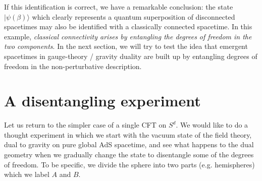 \documentclass[12pt,epsf]{article}
\renewcommand{\(}{\left(}
\renewcommand{\)}{\right)}
\begin{document}
If this identification is correct, we have a remarkable conclusion: the state $|\psi (\beta) \rangle$ which clearly represents a quantum superposition of disconnected spacetimes may also be identified with a classically connected spacetime. In this example, {\it classical connectivity arises by entangling the degrees of freedom in the two components}. In the next section, we will try to test the idea that emergent spacetimes in gauge-theory / gravity duality are built up by entangling degrees of freedom in the non-perturbative description.

\section{A disentangling experiment}

Let us return to the simpler case of a single CFT on $S^d$. We would like to do a thought experiment in which we start with the vacuum state of the field theory, dual to gravity on pure global AdS spacetime, and see what happens to the dual geometry when we gradually change the state to disentangle some of the degrees of freedom. To be specific, we divide the sphere into two parts (e.g. hemispheres) which we label $A$ and $B$.
\end{document}
